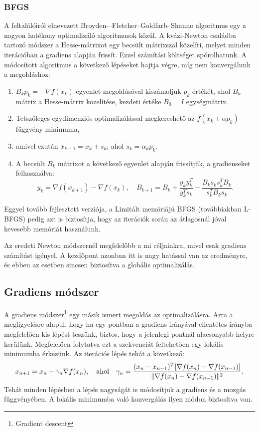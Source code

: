 \subsubsection{BFGS}
A feltalálóiról elnevezett Broyden-–Fletcher--Goldfarb--Shanno algoritmus egy a nagyon hatékony optimalizáló algoritmusok közül. A kvázi-Newton családba tartozó módszer a Hesse-mátrixot egy becsült mátrixszal közelíti, melyet minden iterációban a gradiens alapján frissít. Ezzel számítási költséget spórolhatunk. A módosított algoritmus a következő lépéseket hajtja végre, míg nem konvergálunk a megoldáshoz:
\begin{enumerate}
	\item $B_kp_k=-\nabla f(x_k)$ egyenlet megoldásával kiszámoljuk $p_k$ értékét, ahol $B_k$ mátrix a Hesse-mátrix közelítése, kezdeti értéke $B_0=I$ egységmátrix.
	\item Tetszőleges egydimenziós optimalizálással megkereshető az $f(x_k+\alpha p_k)$ függvény minimuma,
	\item amivel ezután $x_{k+1}=x_k+s_k$, ahol $s_k=\alpha _kp_k$.
	\item A becsült $B_k$ mátrixot a következő egyenlet alapján frissítjük, a gradienseket felhasználva:
	$$y_k=\nabla f(x_{k+1})-\nabla f(x_k), \quad B_{k+1}=B_k+\frac{y_ky_k^T}{y_k^Ts_k}-\frac{B_ks_ks_k^TB_k}{s_k^TB_ks_k}.$$
\end{enumerate}

Eggyel tovább fejlesztett verziója, a Limitált memóriájú BFGS (továbbiakban \mbox{L-BFGS}) pedig azt is biztosítja, hogy az iterációk során az átlagosnál jóval kevesebb memóriát használunk.

Az eredeti Newton módszernél megfelelőbb a mi céljainkra, mivel csak gradiens számítást igényel. A kezdőpont azonban itt is nagy hatással van az eredményre, és ebben az esetben sincsen biztosítva a globális optimalizálás.

\subsection{Gradiens módszer}

A gradiens módszer\footnote{Gradient descent} egy másik ismert megoldás az optimalizálásra. Arra a megfigyelésre alapul, hogy ha egy pontban a gradiens irányával ellentétes irányba megfelelően kis lépést teszünk, biztos, hogy a jelenlegi pontnál alacsonyabb helyre kerülünk. Megfelelően folytatva ezt a szekvenciát feltehetően egy lokális minimumba érkezünk. Az iterációs lépés tehát a következő:
\begin{equation}
	\label{eq:gd}
	x_{n+1}=x_n-\gamma _n\nabla f(x_n),\quad \textnormal{ahol}\quad \gamma _n=\frac{(x_n-x_{n-1})^T[\nabla f(x_n)-\nabla f(x_{n-1})]}{\|\nabla f(x_n)-\nabla f(x_{n-1})\|^2}.
\end{equation}
Tehát minden lépésben a lépés nagyságát is módosítjuk a gradiens és a mozgás függvényében. A lokális minimumba való konvergálás ilyen módon biztosítva van. 

